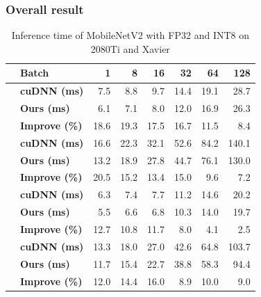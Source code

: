 \subsubsection{Overall result}
\begin{table}[]
\setlength{\tabcolsep}{4.4pt}
    \caption{Inference time of MobileNetV2 with FP32 and INT8 on 2080Ti and Xavier}
    \vspace{-3mm}
    \label{tab:infertime}
    \centering
    \begin{threeparttable}
    \begin{tabular}{c|l|rrrrrr}
    \toprule
    &\textbf{Batch} & 1 & 8 & 16& 32 &64 & 128\\
    \midrule
    &\textbf{cuDNN (ms)}   &7.5  &8.8  &9.7  &14.4 &19.1 &28.7 \\
    &\textbf{Ours (ms)}    &6.1  &7.1  &8.0  &12.0 &16.9 &26.3\\
    &\textbf{Improve (\%)} &18.6 &19.3 &17.5 &16.7 &11.5 &8.4 \\
    \hline
    &\textbf{cuDNN (ms)}   &16.6 &22.3 &32.1 &52.6 &84.2 &140.1  \\
    &\textbf{Ours (ms)}    &13.2 &18.9 &27.8 &44.7 &76.1 &130.0 \\
    &\textbf{Improve (\%)} &20.5 &15.2 &13.4 &15.0 &9.6  &7.2 \\
    \hline
    &\textbf{cuDNN (ms)}   &6.3  &7.4  &7.7  &11.2 &14.6 &20.2 \\
    &\textbf{Ours (ms)}    &5.5  &6.6  &6.8  &10.3 &14.0 &19.7\\
    &\textbf{Improve (\%)} &12.7 &10.8 &11.7 &8.0  &4.1  &2.5 \\
    \hline
    &\textbf{cuDNN (ms)}   &13.3 &18.0 &27.0 &42.6 &64.8 &103.7  \\
    &\textbf{Ours (ms)}    &11.7 &15.4 &22.7 &38.8 &58.3 &94.4 \\
    &\textbf{Improve (\%)} &12.0 &14.4 &16.0 &8.9 &10.0  &9.0 \\
    
    
    \bottomrule
    \end{tabular}
    \footnotesize
    \end{threeparttable}
    
\end{table}


